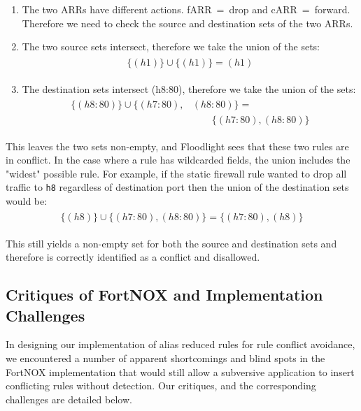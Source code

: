 \begin{enumerate}
\item The two ARRs have different actions. \mbox{fARR = drop} and \mbox{cARR = forward}. Therefore we need to check the source and destination sets of the two ARRs.
\item The two source sets intersect, therefore we take the union of the sets:
\begin{align}
\begin{aligned}
\{(h1)\} \cup \{(h1)\} = (h1) \nonumber
\end{aligned}
\end{align}
\item The destination sets intersect (h8:80), therefore we take the union of the sets:
\begin{align}
\begin{aligned}
\{(h8:80)\} \cup \{(h7:80),&(h8:80)\} = \\
        & \qquad \{(h7:80),(h8:80)\} \nonumber
\end{aligned}
\end{align}
\end{enumerate} 

This leaves the two sets non-empty, and Floodlight sees that these two rules are in conflict.
In the case where a rule has wildcarded fields, the union includes the "widest" possible rule.
For example, if the static firewall rule wanted to drop all traffic to \texttt{h8} regardless of destination port then the union of the destination sets would be:
\begin{align}
\begin{aligned}
\{(h8)\} \cup \{(h7:80),(h8:80)\} =  \{(h7:80),(h8)\} \nonumber
\end{aligned}
\end{align}

This still yields a non-empty set for both the source and destination sets and therefore is correctly identified as a conflict and disallowed.

\subsection{Critiques of FortNOX and Implementation Challenges}
\label{subsec:critique}
In designing our implementation of alias reduced rules for rule conflict avoidance, we encountered a number of apparent shortcomings and blind spots in the FortNOX implementation that would still allow a subversive application to insert conflicting rules without detection. Our critiques, and the corresponding challenges are detailed below.

